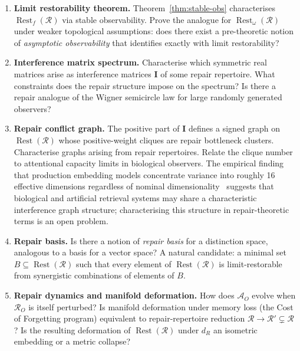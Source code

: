 \documentclass[12pt, oneside]{article}
\theoremstyle{plain}
\theoremstyle{definition}
\theoremstyle{remark}
\theoremstyle{definition}
\DeclareMathOperator{\Rest}{Rest}
\newcommand{\Restf}{\Rest_{f}}
\newcommand{\Reston}{\Rest_{\omega}}
\newcommand{\IntMat}{\mathbf{I}}
\newcommand{\AO}{\mathcal{A}_O}
\begin{document}
\begin{enumerate}
  \item \textbf{Limit restorability theorem.}\;
    Theorem~\ref{thm:stable-obs} characterises $\Restf(\mathcal{R})$
    via stable observability.
    Prove the analogue for $\Reston(\mathcal{R})$ under weaker
    topological assumptions: does there exist a pre-theoretic notion
    of \emph{asymptotic observability} that identifies exactly with
    limit restorability?

  \item \textbf{Interference matrix spectrum.}\;
    Characterise which symmetric real matrices arise as interference
    matrices $\IntMat$ of some repair repertoire.
    What constraints does the repair structure impose on the spectrum?
    Is there a repair analogue of the Wigner semicircle law for
    large randomly generated observers?

  \item \textbf{Repair conflict graph.}\;
    The positive part of $\IntMat$ defines a signed graph on
    $\Rest(\mathcal{R})$ whose positive-weight cliques are repair
    bottleneck clusters.
    Characterise graphs arising from repair repertoires.
    Relate the clique number to attentional capacity limits in
    biological observers.
    The empirical finding that production embedding models concentrate
    variance into roughly 16 effective dimensions regardless of nominal
    dimensionality~\cite{RayBarman2026} suggests that biological and
    artificial retrieval systems may share a characteristic interference
    graph structure; characterising this structure in repair-theoretic
    terms is an open problem.

  \item \textbf{Repair basis.}\;
    Is there a notion of \emph{repair basis} for a distinction space,
    analogous to a basis for a vector space?
    A natural candidate: a minimal set $B \subseteq \Rest(\mathcal{R})$
    such that every element of $\Rest(\mathcal{R})$ is limit-restorable
    from synergistic combinations of elements of $B$.

  \item \textbf{Repair dynamics and manifold deformation.}\;
    How does $\AO$ evolve when $\mathcal{R}_O$ is itself perturbed?
    Is manifold deformation under memory loss (the Cost of Forgetting
    program) equivalent to repair-repertoire reduction
    $\mathcal{R} \to \mathcal{R}' \subsetneq \mathcal{R}$?
    Is the resulting deformation of $\Rest(\mathcal{R})$ under $d_R$
    an isometric embedding or a metric collapse?


\end{enumerate}
\end{document}
